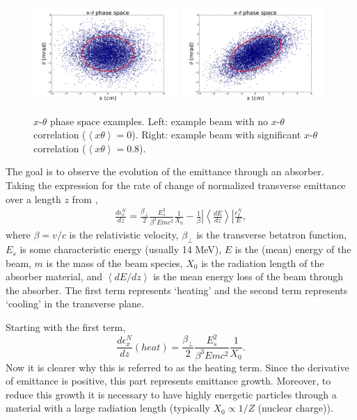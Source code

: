 \begin{figure}
  \begin{center}
    \includegraphics[width=0.49\textwidth]{Figures/ellipse0} 
    \includegraphics[width=0.49\textwidth]{Figures/ellipse1} 
  \caption[$x$-$\theta$ phase space examples.]{$x$-$\theta$ phase space examples. Left: example beam with no $x$-$\theta$ correlation ($\left<x\theta\right>=0$). Right: example beam with significant $x$-$\theta$ correlation ($\left<x\theta\right>=0.8$).}
  \label{fig:ellipses}
 \end{center}
\end{figure}

The goal is to observe the evolution of the emittance through an absorber. Taking the expression for the rate of change of normalized transverse emittance over a length $z$ from \cite{johnson},
\begin{align*}
\frac{d\epsilon^N _x}{dz}=\frac{\beta_\perp}{2}\frac{E_s^2}{\beta^3Emc^2}\frac{1}{X_0}-\frac{1}{\beta}\left| \left<\frac{dE}{dz}\right>\right| \frac{\epsilon_x^N}{E},
\end{align*}
where $\beta=v/c$ is the relativistic velocity, $\beta_\perp$ is the transverse betatron function, $E_s$ is some characteristic energy (usually 14 MeV), $E$ is the (mean) energy of the beam, $m$ is the mass of the beam species, $X_0$ is the radiation length of the absorber material, and $\left<dE/dz\right>$ is the mean energy loss of the beam through the absorber. The first term represents `heating' and the second term represents `cooling' in the transverse plane. 

Starting with the first term,
\begin{equation}
\label{eqn:emittanceheat}
\frac{d\epsilon_x^N}{dz}(heat) = \frac{\beta_\perp}{2}\frac{E_s^2}{\beta^3Emc^2}\frac{1}{X_0}.
\end{equation}
Now it is clearer why this is referred to as the heating term. Since the derivative of emittance is positive, this part represents emittance growth. Moreover, to reduce this growth it is necessary to have highly energetic particles through a material with a large radiation length (typically $X_0 \propto 1/Z$ (nuclear charge)).

